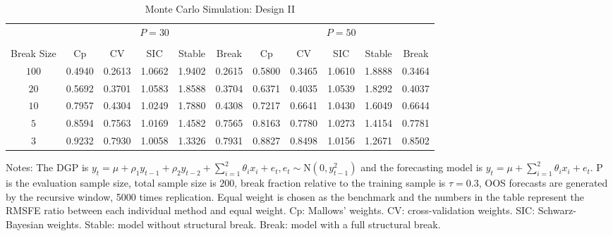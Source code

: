 \newpage
\begin{table}
    \caption{Monte Carlo Simulation: Design II} \label{ntb:2}
    \centering
    \begin{adjustbox}{width=\textwidth,totalheight=\textheight,keepaspectratio}
    \begin{threeparttable}
    \begin{tabular}{ccccccccccc}
    \toprule
     & \multicolumn{5}{c}{$P = 30$} & \multicolumn{5}{c}{$P = 50$} \\
    \cmidrule(r){2-6}
    \cmidrule(r){7-11} \\
    Break Size      & Cp     & CV     & SIC    & Stable & Break  & Cp     & CV     & SIC    & Stable & Break  \\
    $100$           & 0.4940 & 0.2613 & 1.0662 & 1.9402 & 0.2615 & 0.5800 & 0.3465 & 1.0610 & 1.8888 & 0.3464 \\
    $20$            & 0.5692 & 0.3701 & 1.0583 & 1.8588 & 0.3704 & 0.6371 & 0.4035 & 1.0539 & 1.8292 & 0.4037 \\
    $10$            & 0.7957 & 0.4304 & 1.0249 & 1.7880 & 0.4308 & 0.7217 & 0.6641 & 1.0430 & 1.6049 & 0.6644 \\
    $5$             & 0.8594 & 0.7563 & 1.0169 & 1.4582 & 0.7565 & 0.8163 & 0.7780 & 1.0273 & 1.4154 & 0.7781 \\
    $3$             & 0.9232 & 0.7930 & 1.0058 & 1.3326 & 0.7931 & 0.8827 & 0.8498 & 1.0156 & 1.2671 & 0.8502 \\
    \bottomrule
    \end{tabular}
    \begin{tablenotes} \footnotesize
    Notes: The DGP is $y_{t} = \mu + \rho_{1}y_{t-1} + \rho_{2}y_{t-2} + \sum_{i=1}^{2}\theta_{i}x_{i} + e_{t}, e_{t} \sim \mathrm{N}(0, y_{t-1}^{2})$ and the forecasting model is $y_{t} = \mu + \sum_{i=1}^{2}\theta_{i}x_{i} + e_{t}$. $\mathrm{P}$ is the evaluation sample size, total sample size is $200$, break fraction relative to the training sample is $\tau = 0.3$, OOS forecasts are generated by the recursive window, 5000 times replication. Equal weight is chosen as the benchmark and the numbers in the table represent the RMSFE ratio between each individual method and equal weight. Cp: Mallows' weights. CV: cross-validation weights. SIC: Schwarz-Bayesian weights. Stable: model without structural break. Break: model with a full structural break.
    \end{tablenotes}
    \end{threeparttable}
    \end{adjustbox}
\end{table}